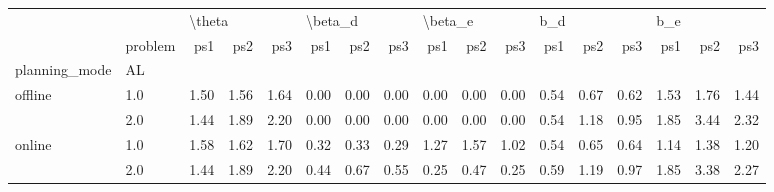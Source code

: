 \begin{tabular}{llrrrrrrrrrrrrrrr}
\toprule
       & {} & \multicolumn{3}{l}{\textbackslash theta} & \multicolumn{3}{l}{\textbackslash beta\_d} & \multicolumn{3}{l}{\textbackslash beta\_e} & \multicolumn{3}{l}{b\_d} & \multicolumn{3}{l}{b\_e} \\
       & problem &    ps1 &  ps2 &  ps3 &     ps1 &  ps2 &  ps3 &     ps1 &  ps2 &  ps3 &  ps1 &  ps2 &  ps3 &  ps1 &  ps2 &  ps3 \\
planning\_mode & AL &        &      &      &         &      &      &         &      &      &      &      &      &      &      &      \\
\midrule
offline & 1.0 &   1.50 & 1.56 & 1.64 &    0.00 & 0.00 & 0.00 &    0.00 & 0.00 & 0.00 & 0.54 & 0.67 & 0.62 & 1.53 & 1.76 & 1.44 \\
       & 2.0 &   1.44 & 1.89 & 2.20 &    0.00 & 0.00 & 0.00 &    0.00 & 0.00 & 0.00 & 0.54 & 1.18 & 0.95 & 1.85 & 3.44 & 2.32 \\
online & 1.0 &   1.58 & 1.62 & 1.70 &    0.32 & 0.33 & 0.29 &    1.27 & 1.57 & 1.02 & 0.54 & 0.65 & 0.64 & 1.14 & 1.38 & 1.20 \\
       & 2.0 &   1.44 & 1.89 & 2.20 &    0.44 & 0.67 & 0.55 &    0.25 & 0.47 & 0.25 & 0.59 & 1.19 & 0.97 & 1.85 & 3.38 & 2.27 \\
\bottomrule
\end{tabular}
